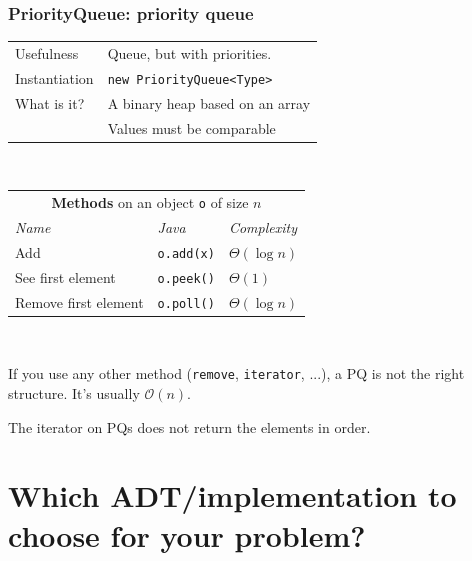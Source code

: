 \documentclass[8pt,aspectratio=169]{beamer}
\begin{document}
\begin{frame}
\frametitle{PriorityQueue: priority queue}
\centering
\begin{tabular}{ll}
	Usefulness & Queue, but with priorities.\\
	Instantiation & \texttt{new PriorityQueue<Type>}\\
	What is it? & A binary heap based on an array\\
	& \color{red} Values must be comparable
	
\end{tabular}\\
\vspace{0.5cm}
\centering
\begin{tabular}{lll}
	\multicolumn{3}{c}{\textbf{Methods} on an object \texttt{o} of size $n$} \\
	\textit{Name} & \textit{Java} & \textit{Complexity} \\
	Add & \texttt{o.add(x)} & $\Theta(\log n)$\\
	See first element & \texttt{o.peek()} & $\Theta(1)$\\
	Remove first element & \texttt{o.poll()} & $\Theta(\log n)$
\end{tabular}\\
\vspace{0.5cm}

\color{red} If you use any other method (\texttt{remove}, \texttt{iterator}, ...), a PQ is not the right structure. It's usually $\mathcal{O}(n)$.

\color{red} The iterator on PQs does not return the elements in order.
\end{frame}

\section{Which ADT/implementation to choose for your problem?}
\end{document}
